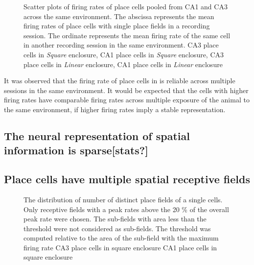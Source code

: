 \begin{figure}[htb!]
{}

\label{fig:rateremapping}
\caption[Rate Remapping]{Scatter plots of firing rates of place cells pooled from CA1 and CA3  across the same environment. The abscissa represents the mean firing rates of place cells with single place fields in a recording session. The ordinate represents the mean firing rate of the same cell in another recording session in the same environment.  CA3 place cells in \emph{Square} enclosure,  CA1 place cells in \emph{Square} enclosure,  CA3 place cells in \emph{Linear} enclosure,  CA1 place cells in \emph{Linear} enclosure}
\end{figure}

It was observed that the firing rate of place cells in is reliable across multiple sessions in the same environment. It would be expected that the cells with higher firing rates have comparable firing rates across multiple exposure of the animal to the same environment, if higher firing rates imply a stable representation. 

\subsection*{The neural representation of spatial information is sparse[stats?]}

\subsection*{Place cells have multiple spatial receptive fields}
\begin{figure}[htb!]
\label{fig:nsubfields}
\caption[Multiple fields of Place Cells]{The distribution of number of distinct place fields of a single cells. Only receptive fields with a peak rates above the 20 \% of the overall peak rate were chosen. The sub-fields with area less than the threshold were not considered as sub-fields. The threshold was computed relative to the area of the sub-field with the maximum firing rate  CA3 place cells in square enclosure  CA1 place cells in square enclosure}
\end{figure}

